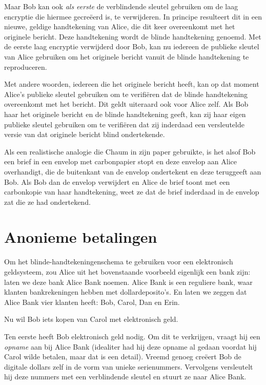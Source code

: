 \documentclass[
  a5paper,
  smalldemyvopaper,11pt,twoside,onecolumn,openright,extrafontsizes,
hidelinks]{memoir}
\begin{document}
Maar Bob kan ook \emph{als eerste} de verblindende sleutel gebruiken om
de laag encryptie die hiermee gecreëerd is, te verwijderen. In principe
resulteert dit in een nieuwe, geldige handtekening van Alice, die dit
keer overeenkomt met het originele bericht. Deze handtekening wordt de
blinde handtekening genoemd. Met de eerste laag encryptie verwijderd
door Bob, kan nu iedereen de publieke sleutel van Alice gebruiken om het
originele bericht vanuit de blinde handtekening te reproduceren.

Met andere woorden, iedereen die het originele bericht heeft, kan op dat
moment Alice's publieke sleutel gebruiken om te verifiëren dat de blinde
handtekening overeenkomt met het bericht. Dit geldt uiteraard ook voor
Alice zelf. Als Bob haar het originele bericht en de blinde handtekening
geeft, kan zij haar eigen publieke sleutel gebruiken om te verifiëren
dat zij inderdaad een versleutelde versie van dat originele bericht
blind ondertekende.

Als een realistische analogie die Chaum in zijn paper gebruikte, is het
alsof Bob een brief in een envelop met carbonpapier stopt en deze
envelop aan Alice overhandigt, die de buitenkant van de envelop
ondertekent en deze teruggeeft aan Bob. Als Bob dan de envelop
verwijdert en Alice de brief toont met een carbonkopie van haar
handtekening, weet ze dat de brief inderdaad in de envelop zat die ze
had ondertekend.

\section{Anonieme betalingen}\label{anonieme-betalingen}

Om het blinde-handtekeningenschema te gebruiken voor een elektronisch
geldsysteem, zou Alice uit het bovenstaande voorbeeld eigenlijk een bank
zijn: laten we deze bank Alice Bank noemen. Alice Bank is een reguliere
bank, waar klanten bankrekeningen hebben met dollardeposito's. En laten
we zeggen dat Alice Bank vier klanten heeft: Bob, Carol, Dan en Erin.

Nu wil Bob iets kopen van Carol met elektronisch geld.

Ten eerste heeft Bob elektronisch geld nodig. Om dit te verkrijgen,
vraagt hij een \emph{opname} aan bij Alice Bank (idealiter had hij deze
opname al gedaan voordat hij Carol wilde betalen, maar dat is een
detail). Vreemd genoeg creëert Bob de digitale dollars zelf in de vorm
van unieke serienummers. Vervolgens versleutelt hij deze nummers met een
verblindende sleutel en stuurt ze naar Alice Bank.
\end{document}
